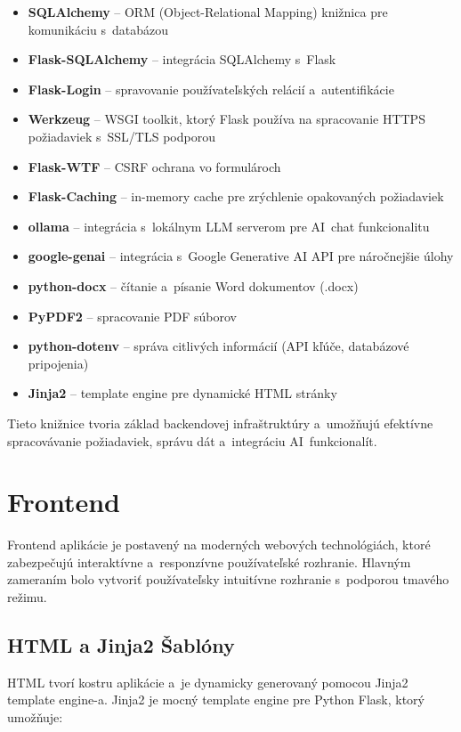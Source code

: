 \begin{itemize}
  \item \textbf{SQLAlchemy} -- ORM (Object-Relational Mapping) knižnica pre komunikáciu s~databázou
  \item \textbf{Flask-SQLAlchemy} -- integrácia SQLAlchemy s~Flask
  \item \textbf{Flask-Login} -- spravovanie používateľských relácií a~autentifikácie
  \item \textbf{Werkzeug} -- WSGI toolkit, ktorý Flask používa na spracovanie HTTPS požiadaviek
        s~SSL/TLS podporou
  \item \textbf{Flask-WTF} -- CSRF ochrana vo formulároch
  \item \textbf{Flask-Caching} -- in-memory cache pre zrýchlenie opakovaných požiadaviek
  \item \textbf{ollama} -- integrácia s~lokálnym LLM serverom pre AI~chat funkcionalitu
  \item \textbf{google-genai} -- integrácia s~Google Generative AI API pre náročnejšie úlohy
  \item \textbf{python-docx} -- čítanie a~písanie Word dokumentov (.docx)
  \item \textbf{PyPDF2} -- spracovanie PDF súborov
  \item \textbf{python-dotenv} -- správa citlivých informácií (API kľúče, databázové pripojenia)
  \item \textbf{Jinja2} -- template engine pre dynamické HTML stránky
\end{itemize}

        Tieto knižnice tvoria základ backendovej infraštruktúry a~umožňujú efektívne
spracovávanie požiadaviek, správu dát a~integráciu AI~funkcionalít.

\section{Frontend}

        Frontend aplikácie je postavený na moderných webových technológiách, ktoré
zabezpečujú interaktívne a~responzívne používateľské rozhranie. Hlavným zameraním
bolo vytvoriť používateľsky intuitívne rozhranie s~podporou tmavého režimu.

\subsection{HTML a Jinja2 Šablóny}

        HTML tvorí kostru aplikácie a~je dynamicky generovaný pomocou Jinja2 template
engine-a. Jinja2 je mocný template engine pre Python Flask, ktorý umožňuje:

